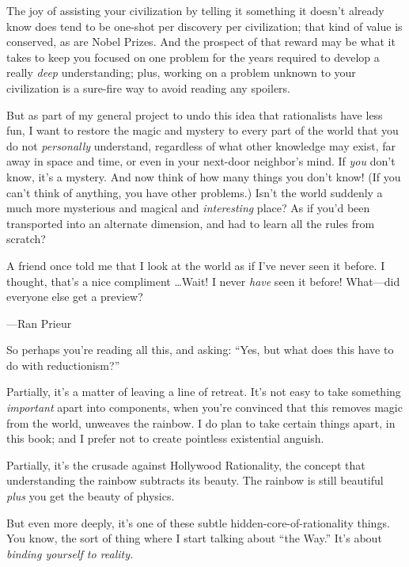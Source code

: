 {
 The joy of assisting your civilization by telling it something it
doesn't already know does tend to be one-shot per
discovery per civilization; that kind of value is conserved, as are
Nobel Prizes. And the prospect of that reward may be what it takes to
keep you focused on one problem for the years required to develop a
really \textit{deep} understanding; plus, working on a problem unknown
to your civilization is a sure-fire way to avoid reading any spoilers.}

{
 But as part of my general project to undo this idea that
rationalists have less fun, I want to restore the magic and mystery to
every part of the world that you do not \textit{personally} understand,
regardless of what other knowledge may exist, far away in space and
time, or even in your next-door neighbor's mind. If
\textit{you} don't know, it's a
mystery. And now think of how many things you don't
know! (If you can't think of anything, you have other
problems.) Isn't the world suddenly a much more
mysterious and magical and \textit{interesting} place? As if
you'd been transported into an alternate dimension, and
had to learn all the rules from scratch?}

{
 A friend once told me that I look at the world as if
I've never seen it before. I thought,
that's a nice compliment \ldots Wait! I never
\textit{have} seen it before! What---did everyone else get a preview?}

{\raggedleft
 {}---Ran Prieur
\par}


\bigskip

\myendsectiontext


{
 So perhaps you're reading all this, and asking:
``Yes, but what does this have to do with
reductionism?'' }

{
 Partially, it's a matter of leaving a line of
retreat. It's not easy to take something
\textit{important} apart into components, when you're
convinced that this removes magic from the world, unweaves the rainbow.
I do plan to take certain things apart, in this book; and I prefer not
to create pointless existential anguish.}

{
 Partially, it's the crusade against Hollywood
Rationality, the concept that understanding the rainbow subtracts its
beauty. The rainbow is still beautiful \textit{plus} you get the beauty
of physics.}

{
 But even more deeply, it's one of these subtle
hidden-core-of-rationality things. You know, the sort of thing where I
start talking about ``the Way.''
It's about \textit{binding yourself to reality.}}

